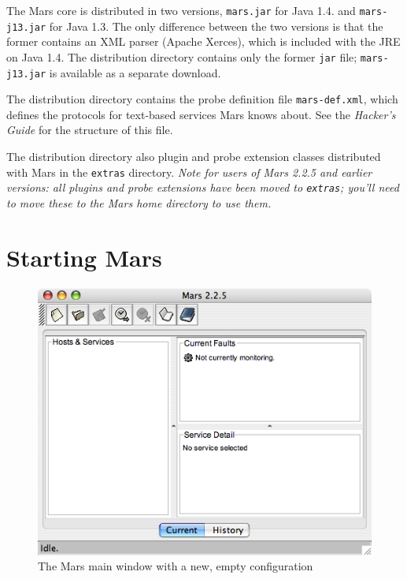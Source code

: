 \documentclass{article}
\newcommand{\filename}[1]{{\tt #1}}
\begin{document}
The Mars core is distributed in two versions, \filename{mars.jar} for
Java 1.4. and \filename{mars-j13.jar} for Java 1.3. The only
difference between the two versions is that the former contains an XML
parser (Apache Xerces), which is included with the JRE on Java
1.4. The distribution directory contains only the former
\filename{jar} file; \filename{mars-j13.jar} is available as a
separate download.

The distribution directory contains the probe definition file
\filename{mars-def.xml}, which defines the protocols for text-based
services Mars knows about. See the {\sl Hacker's Guide} for the
structure of this file.

The distribution directory also plugin and probe extension classes
distributed with Mars in the \filename{extras} directory. {\em Note
  for users of Mars 2.2.5 and earlier versions: all plugins and probe
  extensions have been moved to \filename{extras}; you'll need to move
  these to the Mars home directory to use them.}

\section{Starting Mars}
\begin{figure}
\begin{center}
\includegraphics[scale=0.5]{images/screen_main_new}
\end{center}
\caption{The Mars main window with a new, empty configuration}
\label{fig_screen_main_new}
\end{figure} 
\end{document}
